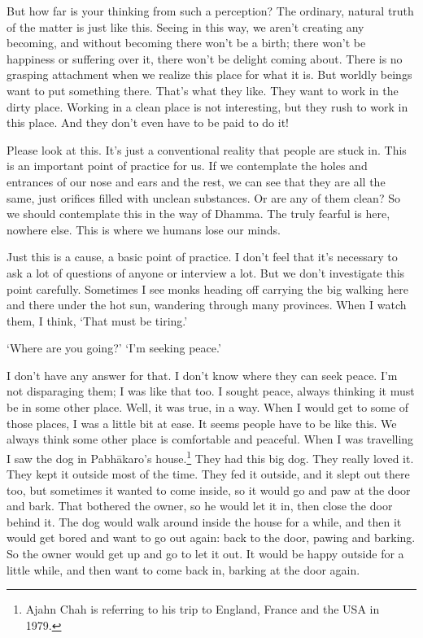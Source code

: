 But how far is your thinking from such a perception? The ordinary, natural truth of the matter is just like this. Seeing in this way, we aren't creating any becoming, and without becoming there won't be a birth; there won't be happiness or suffering over it, there won't be delight coming about. There is no grasping attachment when we realize this place for what it is. But worldly beings want to put something there. That's what they like. They want to work in the dirty place. Working in a clean place is not interesting, but they rush to work in this place. And they don't even have to be paid to do it!

Please look at this. It's just a conventional reality that people are stuck in. This is an important point of practice for us. If we contemplate the holes and entrances of our nose and ears and the rest, we can see that they are all the same, just orifices filled with unclean substances. Or are any of them clean? So we should contemplate this in the way of Dhamma. The truly fearful is here, nowhere else. This is where we humans lose our minds.

Just this is a cause, a basic point of practice. I don't feel that it's necessary to ask a lot of questions of anyone or interview a lot. But we don't investigate this point carefully. Sometimes I see monks heading off carrying the big  walking here and there under the hot sun, wandering through many provinces. When I watch them, I think, `That must be tiring.'

`Where are you going?' `I'm seeking peace.' 

I don't have any answer for that. I don't know where they can seek peace. I'm not disparaging them; I was like that too. I sought peace, always thinking it must be in some other place. Well, it was true, in a way. When I would get to some of those places, I was a little bit at ease. It seems people have to be like this. We always think some other place is comfortable and peaceful. When I was travelling I saw the dog in Pabh\=akaro's house.\footnote{Ajahn Chah is referring to his trip to England, France and the USA in 1979.} They had this big dog. They really loved it. They kept it outside most of the time. They fed it outside, and it slept out there too, but sometimes it wanted to come inside, so it would go and paw at the door and bark. That bothered the owner, so he would let it in, then close the door behind it. The dog would walk around inside the house for a while, and then it would get bored and want to go out again: back to the door, pawing and barking. So the owner would get up and go to let it out. It would be happy outside for a little while, and then want to come back in, barking at the door again.

